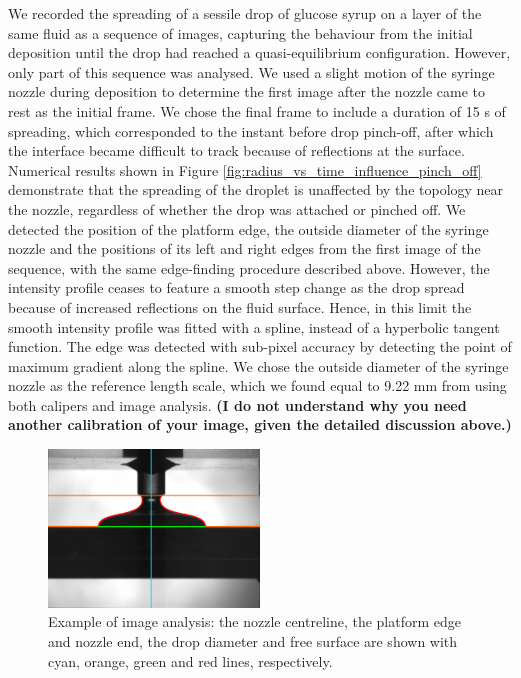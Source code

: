 \documentclass[aip,graphicx]{revtex4-1}
\begin{document}
We recorded the spreading of a sessile drop of glucose syrup on a layer of the same fluid as a sequence of images, capturing the behaviour from the initial deposition until the drop had reached a quasi-equilibrium configuration. 
However, only part of this sequence was analysed. We used a slight motion of the syringe nozzle during deposition to determine the first image after the nozzle came to rest as the initial frame.
We chose the final frame to include a duration of 15 s of spreading, which corresponded to the instant before drop pinch-off, after which the interface became difficult to track because of reflections at the surface. Numerical results shown in Figure \ref{fig:radius_vs_time_influence_pinch_off} demonstrate that the spreading of the droplet is unaffected by the topology near the nozzle, regardless of whether the drop was attached or pinched off. We detected the position of the platform edge, the outside diameter of the syringe nozzle and the positions of its left and right edges from the first image of the sequence, with the same edge-finding procedure described above. However, the intensity profile ceases to feature a smooth step change as the drop spread because of  increased reflections on the fluid surface. Hence, in this limit the smooth intensity profile was fitted with a spline, instead of a hyperbolic tangent function. The edge was detected with sub-pixel accuracy by detecting the point of maximum gradient along the spline. 
We chose the outside diameter of the syringe nozzle as the reference length scale, which we found equal to 9.22 mm from using both calipers and image analysis. {\bf (I do not understand why you need another calibration of your image, given the detailed discussion above.)}

\begin{figure}[!ht]
\centering
\includegraphics[clip,width=0.5\textwidth]{figures/111014_glucose_syrup_thick_layer_8_0117_analysed.eps}
\caption{Example of image analysis: the nozzle centreline, the platform edge and nozzle end, the drop diameter and free surface are shown with cyan, orange, green and red lines, respectively.}
\label{fig:analysis_glucose}
\end{figure}
\end{document}
